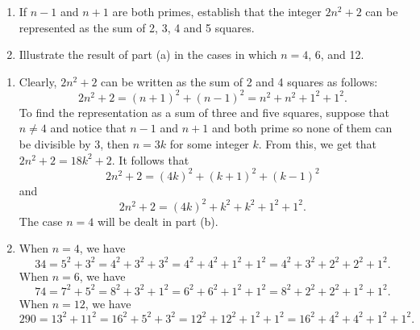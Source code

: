 \begin{exercise}
    \begin{enumerate}
        \item If $n - 1$ and $n + 1$ are both primes, establish that the integer $2n^2 + 2$ can be represented as the sum of 2, 3, 4 and 5 squares.
        \item Illustrate the result of part (a) in the cases in which $n = 4$, 6, and 12. \\
    \end{enumerate}
\end{exercise}

\begin{solution}
    \begin{enumerate}
        \item Clearly, $2n^2 + 2$ can be written as the sum of 2 and 4 squares as follows:
        $$2n^2 + 2 = (n+1)^2 + (n-1)^2 = n^2 + n^2 + 1^2 + 1^2.$$
        To find the representation as a sum of three and five squares, suppose that $n \neq 4$ and notice that $n-1$ and $n + 1$ and both prime so none of them can be divisible by 3, then $n = 3k$ for some integer $k$. From this, we get that $2n^2 + 2 = 18k^2 + 2$. It follows that 
        $$2n^2 + 2 = (4k)^2 + (k+1)^2 + (k-1)^2$$
        and
        $$2n^2 + 2 = (4k)^2 + k^2 + k^2 + 1^2 + 1^2.$$
        The case $n = 4$ will be dealt in part (b).
        \item When $n = 4$, we have
        $$34 = 5^2 + 3^2 = 4^2 + 3^2 + 3^2 = 4^2 + 4^2 + 1^2 + 1^2 = 4^2 + 3^2 + 2^2 + 2^2 + 1^2.$$
        When $n = 6$, we have
        $$74 = 7^2 + 5^2 = 8^2 + 3^2 + 1^2 = 6^2 + 6^2 + 1^2 + 1^2 = 8^2 + 2^2 + 2^2 + 1^2 + 1^2.$$
        When $n = 12$, we have
        $$290 = 13^2 + 11^2 = 16^2 + 5^2 + 3^2 = 12^2 + 12^2 + 1^2 + 1^2 = 16^2 + 4^2 + 4^2 + 1^2 + 1^2.$$
    \end{enumerate}
\end{solution}